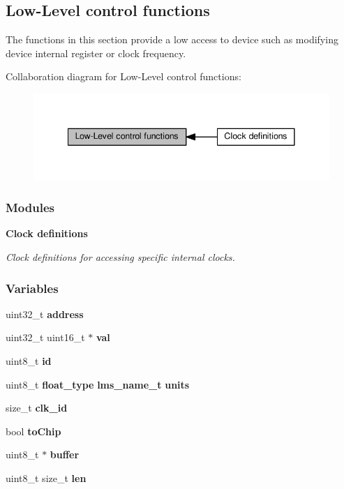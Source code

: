 \subsection{Low-\/\+Level control functions}
\label{group__FN__LOW__LVL}


The functions in this section provide a low access to device such as modifying device internal register or clock frequency.  


Collaboration diagram for Low-\/\+Level control functions\+:
\nopagebreak
\begin{figure}[H]
\begin{center}
\leavevmode
\includegraphics[width=341pt]{d3/d0a/group__FN__LOW__LVL}
\end{center}
\end{figure}
\subsubsection*{Modules}
\begin{DoxyCompactItemize}
\item 
{\bf Clock definitions}
\begin{DoxyCompactList}\small\item\em Clock definitions for accessing specific internal clocks. \end{DoxyCompactList}\end{DoxyCompactItemize}
\subsubsection*{Variables}
\begin{DoxyCompactItemize}
\item 
uint32\+\_\+t {\bf address}
\item 
uint32\+\_\+t uint16\+\_\+t $\ast$ {\bf val}
\item 
uint8\+\_\+t {\bf id}
\item 
uint8\+\_\+t {\bf float\+\_\+type} {\bf lms\+\_\+name\+\_\+t} {\bf units}
\item 
size\+\_\+t {\bf clk\+\_\+id}
\item 
bool {\bf to\+Chip}
\item 
uint8\+\_\+t $\ast$ {\bf buffer}
\item 
uint8\+\_\+t size\+\_\+t {\bf len}
\end{DoxyCompactItemize}


